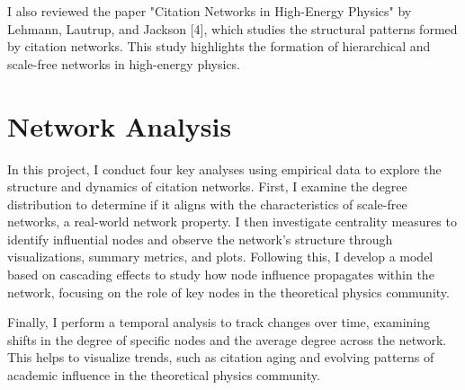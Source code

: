 \documentclass{article}
\begin{document}
I also reviewed the paper "Citation Networks in High-Energy Physics" by Lehmann, Lautrup, and Jackson [4], which studies the structural patterns formed by citation networks. This study highlights the formation of hierarchical and scale-free networks in high-energy physics.

\section{Network Analysis}
\label{headings}
In this project, I conduct four key analyses using empirical data to explore the structure and dynamics of citation networks. First, I examine the degree distribution to determine if it aligns with the characteristics of scale-free networks, a real-world network property. I then investigate centrality measures to identify influential nodes and observe the network's structure through visualizations, summary metrics, and plots. Following this, I develop a model based on cascading effects to study how node influence propagates within the network, focusing on the role of key nodes in the theoretical physics community.

Finally, I perform a temporal analysis to track changes over time, examining shifts in the degree of specific nodes and the average degree across the network. This helps to visualize trends, such as citation aging and evolving patterns of academic influence in the theoretical physics community. 
\end{document}
